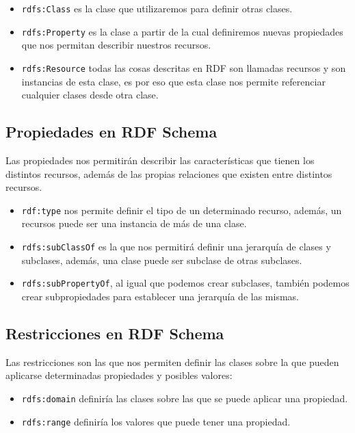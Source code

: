 	\begin{itemize}
		\item {\tt rdfs:Class} es la clase que utilizaremos para definir otras clases.
		\item {\tt rdfs:Property} es la clase a partir de la cual definiremos nuevas propiedades que nos permitan describir nuestros recursos.
		\item {\tt rdfs:Resource} todas las cosas descritas en {\sf RDF} son llamadas {\sf recursos} y son instancias de esta clase, es por eso que esta clase nos permite referenciar cualquier clases desde otra clase.
	\end{itemize}

\subsection{Propiedades en RDF Schema}
Las propiedades nos permitirán describir las características que tienen los distintos recursos, además de las propias relaciones que existen entre distintos recursos.

	\begin{itemize}
		\item {\tt rdf:type} nos permite definir el tipo de un determinado recurso, además, un recursos puede ser una instancia de más de una clase.
		\item {\tt rdfs:subClassOf} es la que nos permitirá definir una jerarquía de clases y subclases, además, una clase puede ser subclase de otras subclases.
		\item {\tt rdfs:subPropertyOf}, al igual que podemos crear subclases, también podemos crear subpropiedades para establecer una jerarquía de las mismas.
	\end{itemize}

\subsection{Restricciones en RDF Schema}	

Las restricciones son las que nos permiten definir las clases sobre la que pueden aplicarse determinadas propiedades y posibles valores:

	\begin{itemize}
		\item {\tt rdfs:domain} definiría las clases sobre las que se puede aplicar una propiedad.
		\item {\tt rdfs:range} definiría los valores que puede tener una propiedad.
	\end{itemize}

